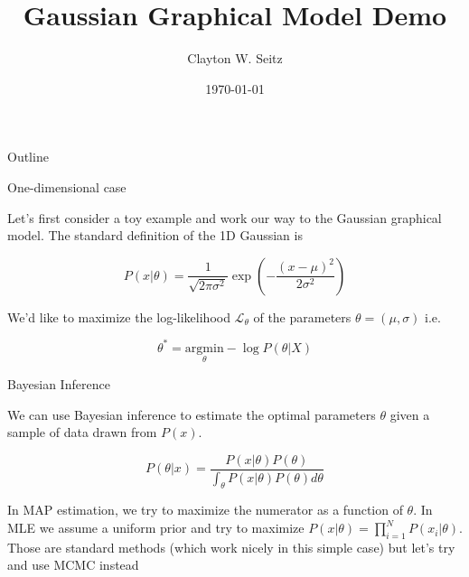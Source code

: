 \documentclass{beamer}					%
\title{Gaussian Graphical Model Demo}	%
\author{Clayton W. Seitz}								%
\date{\today}									%
\begin{document}
\begin{frame}
  \titlepage
\end{frame}

\begin{frame}{Outline}
  \tableofcontents
\end{frame}

%



\begin{frame}{One-dimensional case}

Let's first consider a toy example and work our way to the Gaussian graphical model. The standard definition of the 1D Gaussian is

\begin{equation}
P(x|\theta) = \frac{1}{\sqrt{2\pi \sigma^{2}}}\exp\left(-\frac{(x-\mu)^{2}}{2\sigma^{2}}\right)
\end{equation}

We'd like to maximize the log-likelihood $\mathcal{L}_{\theta}$ of the parameters $\theta=(\mu,\sigma)$ i.e.

\begin{equation*}
\theta^{*} = \underset{\theta}{\mathrm{argmin}} -\log P(\theta|X)
\end{equation*}
\end{frame}

\begin{frame}{Bayesian Inference}

We can use Bayesian inference to estimate the optimal parameters $\theta$ given a sample of data drawn from $P(x)$.

\begin{equation}
P(\theta|x) = \frac{P(x|\theta)P(\theta)}{\int_{\theta} P(x|\theta)P(\theta)d\theta}
\end{equation}

In MAP estimation, we try to maximize the numerator as a function of $\theta$. In MLE we assume a uniform prior and try to maximize $P(x|\theta) = \prod_{i=1}^{N} P(x_{i}|\theta)$.\\
\vspace{0.1in}
Those are standard methods (which work nicely in this simple case) but let's try and use MCMC instead

\end{frame}
\end{document}
